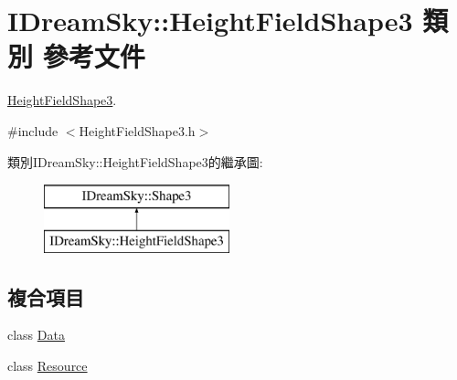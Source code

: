 \hypertarget{class_i_dream_sky_1_1_height_field_shape3}{}\section{I\+Dream\+Sky\+:\+:Height\+Field\+Shape3 類別 參考文件}
\label{class_i_dream_sky_1_1_height_field_shape3}


\hyperlink{class_i_dream_sky_1_1_height_field_shape3}{Height\+Field\+Shape3}.  




{\ttfamily \#include $<$Height\+Field\+Shape3.\+h$>$}

類別\+I\+Dream\+Sky\+:\+:Height\+Field\+Shape3的繼承圖\+:\begin{figure}[H]
\begin{center}
\leavevmode
\includegraphics[height=2.000000cm]{class_i_dream_sky_1_1_height_field_shape3}
\end{center}
\end{figure}
\subsection*{複合項目}
\begin{DoxyCompactItemize}
\item 
class \hyperlink{class_i_dream_sky_1_1_height_field_shape3_1_1_data}{Data}
\item 
class \hyperlink{class_i_dream_sky_1_1_height_field_shape3_1_1_resource}{Resource}
\end{DoxyCompactItemize}
